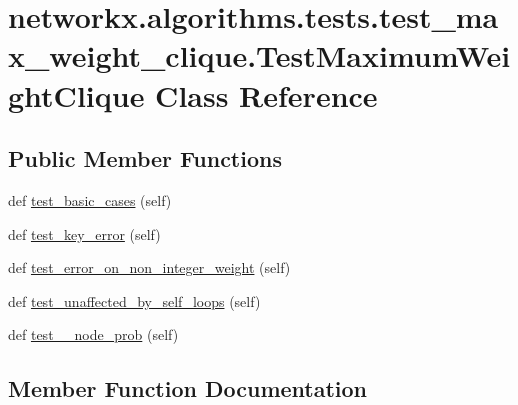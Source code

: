 \hypertarget{classnetworkx_1_1algorithms_1_1tests_1_1test__max__weight__clique_1_1TestMaximumWeightClique}{}\section{networkx.\+algorithms.\+tests.\+test\+\_\+max\+\_\+weight\+\_\+clique.\+Test\+Maximum\+Weight\+Clique Class Reference}
\label{classnetworkx_1_1algorithms_1_1tests_1_1test__max__weight__clique_1_1TestMaximumWeightClique}
\subsection*{Public Member Functions}
\begin{DoxyCompactItemize}
\item 
def \hyperlink{classnetworkx_1_1algorithms_1_1tests_1_1test__max__weight__clique_1_1TestMaximumWeightClique_afffaf253c2e6a5efd23cb6cd800c2a24}{test\+\_\+basic\+\_\+cases} (self)
\item 
def \hyperlink{classnetworkx_1_1algorithms_1_1tests_1_1test__max__weight__clique_1_1TestMaximumWeightClique_af50ea835a35403601062b4f42825fc6f}{test\+\_\+key\+\_\+error} (self)
\item 
def \hyperlink{classnetworkx_1_1algorithms_1_1tests_1_1test__max__weight__clique_1_1TestMaximumWeightClique_a896b3a73692db55f6bccf6050eb31b1e}{test\+\_\+error\+\_\+on\+\_\+non\+\_\+integer\+\_\+weight} (self)
\item 
def \hyperlink{classnetworkx_1_1algorithms_1_1tests_1_1test__max__weight__clique_1_1TestMaximumWeightClique_a5f09186a4309e65e21f482fe2c9116d6}{test\+\_\+unaffected\+\_\+by\+\_\+self\+\_\+loops} (self)
\item 
def \hyperlink{classnetworkx_1_1algorithms_1_1tests_1_1test__max__weight__clique_1_1TestMaximumWeightClique_a2ba8f223e9649c70edcea7ed57c93fc8}{test\+\_\+\_\+node\+\_\+prob} (self)
\end{DoxyCompactItemize}


\subsection{Member Function Documentation}
\mbox{\label{classnetworkx_1_1algorithms_1_1tests_1_1test__max__weight__clique_1_1TestMaximumWeightClique_a2ba8f223e9649c70edcea7ed57c93fc8}} 
